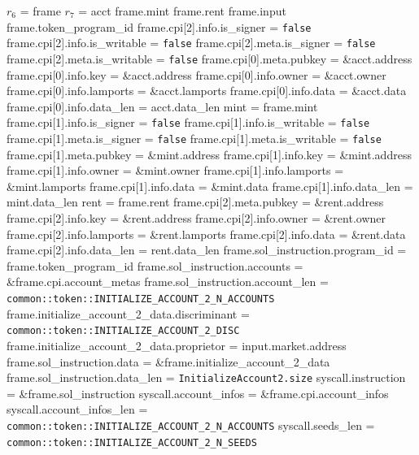 \begin{algorithm}
\caption{INIT-VAULT-TOKEN-ACCOUNT}
\begin{algorithmic}
  \INPUT $r_6$ = frame
  \INPUT $r_7$ = acct
  \REQUIRE frame.mint
  \REQUIRE frame.rent
  \REQUIRE frame.input
  \REQUIRE frame.token\_program\_id
  \REQUIRE frame.cpi[2].info.is\_signer = \texttt{false}
  \REQUIRE frame.cpi[2].info.is\_writable = \texttt{false}
  \REQUIRE frame.cpi[2].meta.is\_signer = \texttt{false}
  \REQUIRE frame.cpi[2].meta.is\_writable = \texttt{false}
  \STATE frame.cpi[0].meta.pubkey = \&acct.address
  \STATE frame.cpi[0].info.key = \&acct.address
  \STATE frame.cpi[0].info.owner = \&acct.owner
  \STATE frame.cpi[0].info.lamports = \&acct.lamports
  \STATE frame.cpi[0].info.data = \&acct.data
  \STATE frame.cpi[0].info.data\_len = acct.data\_len
  \STATE mint = frame.mint
  \STATE frame.cpi[1].info.is\_signer = \texttt{false}
  \STATE frame.cpi[1].info.is\_writable = \texttt{false}
  \STATE frame.cpi[1].meta.is\_signer = \texttt{false}
  \STATE frame.cpi[1].meta.is\_writable = \texttt{false}
  \STATE frame.cpi[1].meta.pubkey = \&mint.address
  \STATE frame.cpi[1].info.key = \&mint.address
  \STATE frame.cpi[1].info.owner = \&mint.owner
  \STATE frame.cpi[1].info.lamports = \&mint.lamports
  \STATE frame.cpi[1].info.data = \&mint.data
  \STATE frame.cpi[1].info.data\_len = mint.data\_len
  \STATE rent = frame.rent
  \STATE frame.cpi[2].meta.pubkey = \&rent.address
  \STATE frame.cpi[2].info.key = \&rent.address
  \STATE frame.cpi[2].info.owner = \&rent.owner
  \STATE frame.cpi[2].info.lamports = \&rent.lamports
  \STATE frame.cpi[2].info.data = \&rent.data
  \STATE frame.cpi[2].info.data\_len = rent.data\_len
  \STATE frame.sol\_instruction.program\_id = frame.token\_program\_id
  \STATE frame.sol\_instruction.accounts = \&frame.cpi.account\_metas
  \STATE frame.sol\_instruction.account\_len =
    \texttt{common::token::INITIALIZE\_ACCOUNT\_2\_N\_ACCOUNTS}
  \STATE frame.initialize\_account\_2\_data.discriminant =
    \texttt{common::token::INITIALIZE\_ACCOUNT\_2\_DISC}
  \STATE frame.initialize\_account\_2\_data.proprietor = input.market.address
  \STATE frame.sol\_instruction.data = \&frame.initialize\_account\_2\_data
  \STATE frame.sol\_instruction.data\_len = \texttt{InitializeAccount2.size}
  \STATE syscall.instruction = \&frame.sol\_instruction
  \STATE syscall.account\_infos = \&frame.cpi.account\_infos
  \STATE syscall.account\_infos\_len =
    \texttt{common::token::INITIALIZE\_ACCOUNT\_2\_N\_ACCOUNTS}
  \STATE syscall.seeds\_len = \texttt{common::token::INITIALIZE\_ACCOUNT\_2\_N\_SEEDS}
  \STATE {}
\ENDPROCEDURE
\end{algorithmic}
\end{algorithm}
